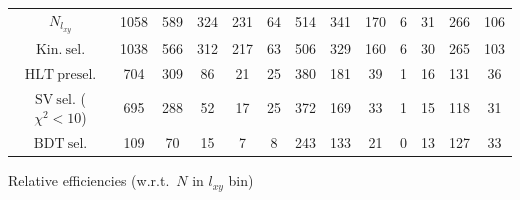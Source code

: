 \documentclass[10pt,a4paper]{article}
\begin{document}
\begin{landscape}
{\begin{tabular}{c|cccc|cccc|cccc}
\midrule
$N_{l_{xy}}$ & 1058 & 589 & 324 & 231 & 64 & 514 & 341 & 170 & 6 & 31 & 266 & 106\\
$\mathrm{Kin.\ sel.}$ & 1038 & 566 & 312 & 217 & 63 & 506 & 329 & 160 & 6 & 30 & 265 & 103\\
$\mathrm{HLT\ presel.}$ & 704 & 309 & 86 & 21 & 25 & 380 & 181 & 39 & 1 & 16 & 131 & 36\\
$\mathrm{SV\ sel.}$ ($\chi^2{<}10$) & 695 & 288 & 52 & 17 & 25 & 372 & 169 & 33 & 1 & 15 & 118 & 31\\
$\mathrm{BDT\ sel.}$ & 109 & 70 & 15 & 7 & 8 & 243 & 133 & 21 & 0 & 13 & 127 & 33\\
\bottomrule
\end{tabular}}

\vspace{18pt}

Relative efficiencies (w.r.t.\ $N$ in $l_{xy}$ bin)


\end{landscape}
\end{document}
